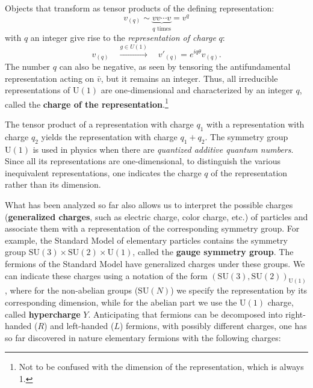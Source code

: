 Objects that transform as tensor products of the defining representation:
\[
    v_{(q)} \sim \underbrace{v v \cdots v}_{q \text{ times}} = v^q
\]
with \(q\) an integer give rise to the \textit{representation of charge} \(q\):
\[
    v_{(q)} \quad \xrightarrow{g \in U(1)} \quad v'_{(q)} = e^{iq\theta} v_{(q)}.
\]
The number \(q\) can also be negative, as seen by tensoring the antifundamental representation acting on \(\bar{v}\), but it remains an integer. Thus, all irreducible representations of \(\mathrm{U}(1)\) are one-dimensional and characterized by an integer \(q\), called the \textbf{charge of the representation}.\footnote{Not to be confused with the dimension of the representation, which is always 1.}

The tensor product of a representation with charge \(q_1\) with a representation with charge \(q_2\) yields the representation with charge \(q_1 + q_2\). The symmetry group \(\mathrm{U}(1)\) is used in physics when there are \textit{quantized additive quantum numbers}. Since all its representations are one-dimensional, to distinguish the various inequivalent representations, one indicates the charge \(q\) of the representation rather than its dimension.

What has been analyzed so far also allows us to interpret the possible charges (\textbf{generalized charges}, such as electric charge, color charge, etc.) of particles and associate them with a representation of the corresponding symmetry group. For example, the Standard Model of elementary particles contains the symmetry group \(\mathrm{SU}(3) \times \mathrm{SU}(2) \times \mathrm{U}(1)\), called the \textbf{gauge symmetry group}. The fermions of the Standard Model have generalized charges under these groups.
We can indicate these charges using a notation of the form \((\mathrm{SU}(3), \mathrm{SU}(2))_{\mathrm{U}(1)}\), where for the non-abelian groups (\(\mathrm{SU}(N)\)) we specify the representation by its corresponding dimension, while for the abelian part we use the \(\mathrm{U}(1)\) charge, called \textbf{hypercharge} \(Y\). Anticipating that fermions can be decomposed into right-handed (\(R\)) and left-handed (\(L\)) fermions, with possibly different charges, one has so far discovered in nature elementary fermions with the following charges:


